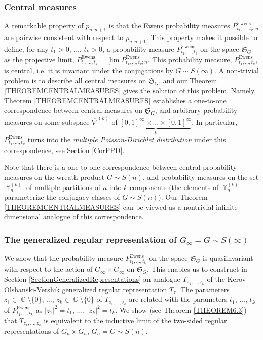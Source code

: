 \documentclass[12pt]{amsart}
\theoremstyle{definition}
\numberwithin{equation}{section}
\DeclareMathOperator{\Y}{\mathbb{Y}}
\DeclareMathOperator{\C}{\mathbb{C}}
\DeclareMathOperator{\Ewens}{Ewens}
\begin{document}
\subsubsection{Central measures}
A remarkable property of $p_{n,n+1}$ is that the Ewens probability measures
$P^{\Ewens}_{t_1,\ldots,t_k;n}$ are pairwise consistent with respect to $p_{n,n+1}$.
This property makes it possible to define, for any $t_1>0$, $\ldots$, $t_k>0$, a probability
measure $P^{\Ewens}_{t_1,\ldots,t_k}$ on the space $\mathfrak{S}_{G}$
as the projective limit, $P^{\Ewens}_{t_1,\ldots,t_k}=\underset{\longleftarrow}{\lim}
P^{\Ewens}_{t_1,\ldots,t_k;n}$.
This probability measure, $P^{\Ewens}_{t_1,\ldots,t_k}$, is central, i.e. it is invariant under the conjugations by $G\sim S(\infty)$.  A non-trivial problem is to describe all
central measures on $\mathfrak{S}_{G}$, and our Theorem  \ref{THEOREMCENTRALMEASURES} gives the solution of this problem. Namely, Theorem  \ref{THEOREMCENTRALMEASURES} establishes a one-to-one correspondence between central measures on $\mathfrak{S}_{G}$, and arbitrary probability measures on some subspace $\overline{\nabla}^{(k)}$ of $\underset{k}{\underbrace{[0,1]^{\infty}\times\ldots\times[0,1]^{\infty}}}$. In particular, $P^{\Ewens}_{t_1,\ldots,t_k}$ turns into the \textit{multiple Poisson-Dirichlet distribution} under this correspondence, see Section \ref{CorPPD}.

Note that there is a one-to-one correspondence between central probability measures on the wreath product $G\sim S(n)$, and probability measures on the set $\Y_n^{(k)}$ of multiple partitions of $n$ into $k$ components (the elements of $\Y_n^{(k)}$ parameterize the conjugacy classes of $G\sim S(n)$). Our Theorem \ref{THEOREMCENTRALMEASURES} can be viewed as a nontrivial infinite-dimensional analogue of this correspondence.
\subsubsection{The generalized regular representation of $G_{\infty}=G\sim S(\infty)$}
We show that the probability measure $P^{\Ewens}_{t_1,\ldots,t_k}$ on the space $\mathfrak{S}_{G}$ is quasiinvariant with respect to the action of
$G_{\infty}\times G_{\infty}$ on $\mathfrak{S}_{G}$. This enables us to construct
in Section \ref{SectionGeneralizedRepresentations} an analogue $T_{z_1,\ldots,z_k}$ of the Kerov-Olshanski-Vershik generalized regular representation $T_z$.
The parameters $z_1\in\C\setminus\{0\}$, $\ldots$,  $z_k\in\C\setminus\{0\}$
of $T_{z_1,\ldots,z_k}$ are related with the parameters $t_1$, $\ldots$, $t_k$
of $P_{t_1,\ldots,t_k}^{\Ewens}$ as
$|z_1|^2=t_1$, $\ldots$, $|z_k|^2=t_k$. We show (see Theorem \ref{THEOREM6.3}) that $T_{z_1,\ldots,z_k}$
is equivalent to the inductive limit of the two-sided regular representations of $G_n\times G_{n}$, $G_n=G\sim S(n)$.
\end{document}
